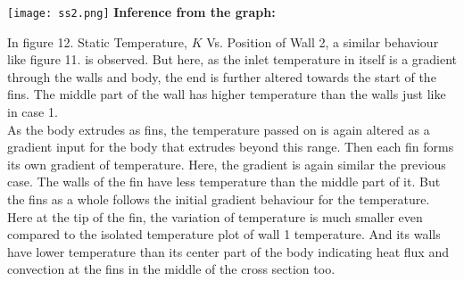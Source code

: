 \documentclass{article}
\begin{document}
\begin{center}
    \texttt{[image: ss2.png]}
    \vspace{2cm}
    \textbf{Inference from the graph: }
    \vspace{1cm}
\end{center}
In figure 12. Static Temperature, $K$ Vs. Position of Wall 2, a similar behaviour like figure 11. is observed. But here, as the inlet temperature in itself is a gradient through the walls and body, the end is further altered towards the start of the fins. The middle part of the wall has higher temperature than the walls just like in case 1. 
\vspace{1cm}\\
As the body extrudes as fins, the temperature passed on is again altered as a gradient input for the body that extrudes beyond this range. Then each fin forms its own gradient of temperature. Here, the gradient is again similar the previous case. The walls of the fin have less temperature than the middle part of it. But the fins as a whole follows the initial gradient behaviour for the temperature. 
\vspace{1cm}\\
Here at the tip of the fin, the variation of temperature is much smaller even compared to the isolated temperature plot of wall 1 temperature. And its walls have lower temperature than its center part of the body indicating heat flux and convection at the fins in the middle of the cross section too. 
\end{document}
